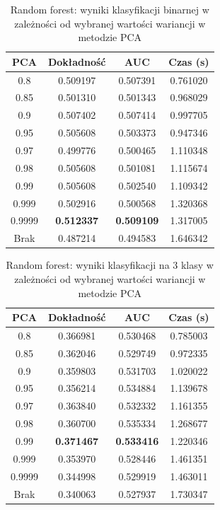 \documentclass[a4paper, twoside, 11pt, openright]{article}
\begin{document}
\begin{table}[H]
    \centering
    \begin{tabular}{|c|c|c|c|}
    \hline
        \textbf{PCA} & \textbf{Dokładność} & \textbf{AUC} & \textbf{Czas (s)} \\ \hline
0.8                &  0.509197 &  0.507391 &    0.761020 \\ \hline
0.85               &  0.501310 &  0.501343 &    0.968029 \\ \hline
0.9                &  0.507402 &  0.507414 &    0.997705 \\ \hline
0.95               &  0.505608 &  0.503373 &    0.947346 \\ \hline
0.97               &  0.499776 &  0.500465 &    1.110348 \\ \hline
0.98               &  0.505608 &  0.501081 &    1.115674 \\ \hline
0.99               &  0.505608 &  0.502540 &    1.109342 \\ \hline
0.999			   &  0.502916 &  0.500568 &    1.320368 \\ \hline
0.9999             &  \textbf{0.512337} &  \textbf{0.509109} &    1.317005 \\ \hline
Brak                &  0.487214 &  0.494583 &    1.646342 \\ \hline
    \end{tabular}
    \caption{Random forest: wyniki klasyfikacji binarnej w zależności od wybranej wartości wariancji w metodzie PCA}
    \label{tab:rf_pca_binary}
\end{table}
\begin{table}[H]
    \centering
    \begin{tabular}{|c|c|c|c|}
    \hline
        \textbf{PCA} & \textbf{Dokładność} & \textbf{AUC} & \textbf{Czas (s)} \\ \hline
0.8                &  0.366981 &  0.530468 &    0.785003 \\ \hline
0.85               &  0.362046 &  0.529749 &    0.972335 \\ \hline
0.9                &  0.359803 &  0.531703 &    1.020022 \\ \hline
0.95               &  0.356214 &  0.534884 &    1.139678 \\ \hline
0.97               &  0.363840 &  0.532332 &    1.161355 \\ \hline
0.98               &  0.360700 &  0.535334 &    1.268677 \\ \hline
0.99               &  \textbf{0.371467} &  \textbf{0.533416} &    1.220346 \\ \hline
0.999		       &  0.353970 &  0.528446 &    1.461351 \\ \hline
0.9999             &  0.344998 &  0.529919 &    1.463011 \\ \hline
Brak                &  0.340063 &  0.527937 &    1.730347 \\ \hline
    \end{tabular}
    \caption{Random forest: wyniki klasyfikacji na 3 klasy w zależności od wybranej wartości wariancji w metodzie PCA}
    \label{tab:rf_pca_discrete}
\end{table}
\end{document}
